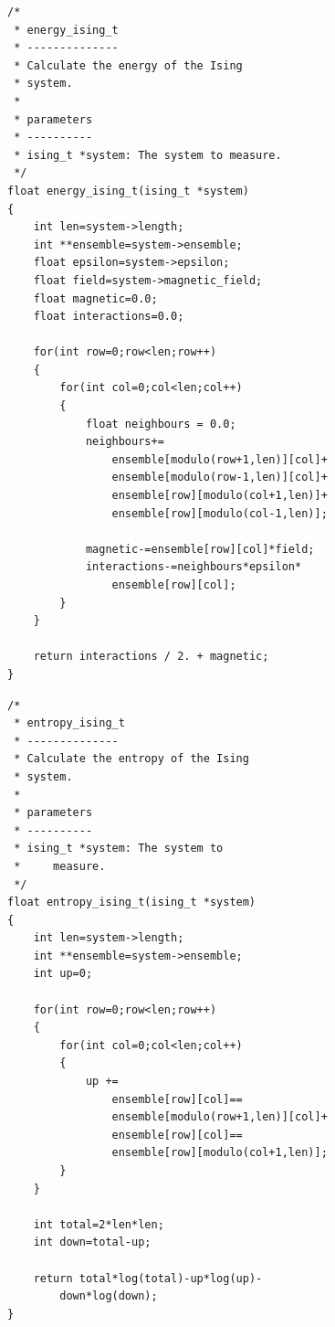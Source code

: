 \documentclass[a4paper, twocolumn]{article}
\begin{document}
\begin{lstlisting}
/*
 * energy_ising_t
 * --------------
 * Calculate the energy of the Ising 
 * system. 
 *
 * parameters
 * ----------
 * ising_t *system: The system to measure. 
 */
float energy_ising_t(ising_t *system)
{
    int len=system->length;
    int **ensemble=system->ensemble;
    float epsilon=system->epsilon;
    float field=system->magnetic_field;
    float magnetic=0.0;
    float interactions=0.0;

    for(int row=0;row<len;row++)
    {
        for(int col=0;col<len;col++)
        {
            float neighbours = 0.0;
            neighbours+=
                ensemble[modulo(row+1,len)][col]+
                ensemble[modulo(row-1,len)][col]+
                ensemble[row][modulo(col+1,len)]+
                ensemble[row][modulo(col-1,len)];

            magnetic-=ensemble[row][col]*field;
            interactions-=neighbours*epsilon*
                ensemble[row][col];
        }
    }

    return interactions / 2. + magnetic;
}
\end{lstlisting}


\begin{lstlisting}
/*
 * entropy_ising_t
 * --------------
 * Calculate the entropy of the Ising 
 * system. 
 *
 * parameters
 * ----------
 * ising_t *system: The system to 
 *     measure. 
 */
float entropy_ising_t(ising_t *system)
{
    int len=system->length;
    int **ensemble=system->ensemble;
    int up=0;

    for(int row=0;row<len;row++)
    {
        for(int col=0;col<len;col++)
        {
            up += 
                ensemble[row][col]==
                ensemble[modulo(row+1,len)][col]+
                ensemble[row][col]==
                ensemble[row][modulo(col+1,len)];
        }
    }
        
    int total=2*len*len;
    int down=total-up;

    return total*log(total)-up*log(up)-
        down*log(down);
}
\end{lstlisting}
\end{document}
